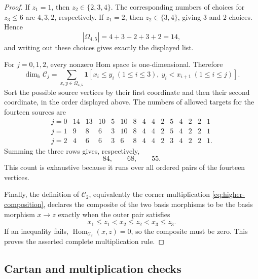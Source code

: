 \documentclass[12pt,a4paper,english,reqno]{amsart}
\theoremstyle{plain}
\theoremstyle{definition}
\newcommand{\kk}{\Bbbk}
\newcommand{\Hom}{\operatorname{Hom}}
\newcommand{\C}{\mathcal C}
\begin{document}
\begin{proof}
If $z_1=1$, then $z_2\in\{2,3,4\}$.  The corresponding numbers of
choices for $z_3\leq6$ are $4,3,2$, respectively.  If $z_1=2$, then
$z_2\in\{3,4\}$, giving $3$ and $2$ choices.  Hence
\[
 |\Omega_{4,5}|=4+3+2+3+2=14,
\]
and writing out these choices gives exactly the displayed list.

For $j=0,1,2$, every nonzero Hom space is one-dimensional.  Therefore
\[
 \dim_{\kk}\C_j
 =
 \sum_{x,y\in\Omega_{4,5}}
 \mathbf 1\!\left[
 x_i\leq y_i\ (1\leq i\leq3),\
 y_i<x_{i+1}\ (1\leq i\leq j)
 \right].
\]
Sort the possible source vertices by their first coordinate and then their
second coordinate, in the order displayed above.  The numbers of allowed
targets for the fourteen sources are
\[
\begin{array}{c|rrrrrrrrrrrrrr}
j=0&14&13&10&5&10&8&4&4&2&5&4&2&2&1\\
j=1& 9& 8& 6&3&10&8&4&4&2&5&4&2&2&1\\
j=2& 4& 6& 6&3& 6&8&4&4&2&3&4&2&2&1.
\end{array}
\]
Summing the three rows gives, respectively,
\[
 84,\qquad68,\qquad55.
\]
This count is exhaustive because it runs over all ordered pairs of the
fourteen vertices.

Finally, the definition of $\C_2$, equivalently the corner multiplication
\eqref{eq:higher-composition}, declares the composite of the two basis
morphisms to be the basis morphism $x\to z$ exactly when the outer pair
satisfies
\[
 x_1\leq z_1<x_2\leq z_2<x_3\leq z_3.
\]
If an inequality fails, $\Hom_{\C_2}(x,z)=0$, so the composite must be
zero.  This proves the asserted complete multiplication rule.
\end{proof}

\subsection{Cartan and multiplication checks}
\end{document}
